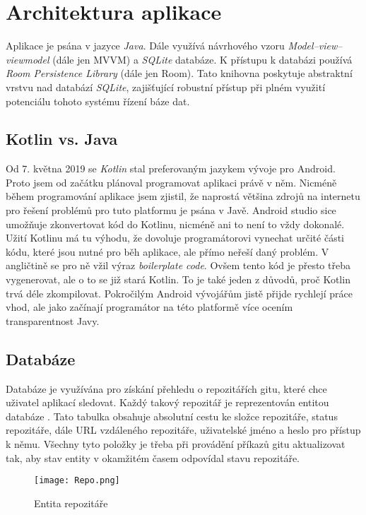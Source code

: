 \section{Architektura aplikace}
Aplikace je psána v jazyce \emph{Java}. Dále využívá návrhového vzoru \emph{Model–view–viewmodel} (dále jen MVVM) a \emph{SQLite} databáze. K přístupu k databázi používá \emph{Room Persistence Library} (dále jen Room). Tato knihovna poskytuje abstraktní vrstvu nad databází \emph{SQLite}, zajišťující robustní přístup při plném využití potenciálu tohoto systému řízení báze dat.

    \subsection{Kotlin vs. Java}
    Od 7. května 2019 se \emph{Kotlin} stal preferovaným jazykem vývoje pro Android. Proto jsem od začátku plánoval programovat aplikaci právě v něm. Nicméně během programování aplikace jsem zjistil, že naprostá většina zdrojů na internetu pro řešení problémů pro tuto platformu je psána v Javě. Android studio sice umožňuje zkonvertovat kód do Kotlinu, nicméně ani to není to vždy dokonalé. Užití Kotlinu má tu výhodu, že dovoluje programátorovi vynechat určité části kódu, které jsou nutné pro běh aplikace, ale přímo neřeší daný problém. V angličtině se pro ně vžil výraz \emph{boilerplate code}. Ovšem tento kód je přesto třeba vygenerovat, ale o to se již stará Kotlin. To je také jeden z důvodů, proč Kotlin trvá déle zkompilovat. Pokročilým Android vývojářům jistě přijde rychlejí práce vhod, ale jako začínají programátor na této platformě více ocením transparentnost Javy.

    \newpage
    \subsection{Databáze}
    Databáze je využívána pro získání přehledu o repozitářích gitu, které chce uživatel aplikací sledovat. Každý takový repozitář je reprezentován entitou databáze . Tato tabulka obsahuje absolutní cestu ke složce repozitáře, status repozitáře, dále URL vzdáleného repozitáře, uživatelské jméno a heslo pro přístup k němu. Všechny tyto položky je třeba při provádění příkazů gitu aktualizovat tak, aby stav entity v okamžitém časem odpovídal stavu repozitáře.

    \begin{figure}[h!]
        \centering
        \vspace{0.5cm}
        \texttt{[image: Repo.png]}
        \caption{Entita repozitáře}
        \label{RepoTable}
    \end{figure}

